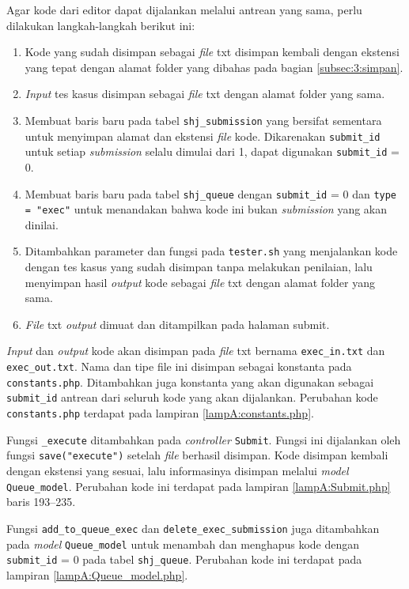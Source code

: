 Agar kode dari editor dapat dijalankan melalui antrean yang sama, perlu dilakukan langkah-langkah berikut ini:
\begin{enumerate}
    \item Kode yang sudah disimpan sebagai \textit{file} txt disimpan kembali dengan ekstensi yang tepat dengan alamat folder yang dibahas pada bagian \ref{subsec:3:simpan}.
    \item \textit{Input} tes kasus disimpan sebagai \textit{file} txt dengan alamat folder yang sama.
    \item Membuat baris baru pada tabel \verb|shj_submission| yang bersifat sementara untuk menyimpan alamat dan ekstensi \textit{file} kode. Dikarenakan \verb|submit_id| untuk setiap \textit{submission} selalu dimulai dari 1, dapat digunakan \verb|submit_id| = 0.
    \item Membuat baris baru pada tabel \verb|shj_queue| dengan \verb|submit_id| = 0 dan \verb|type = "exec"| untuk menandakan bahwa kode ini bukan \textit{submission} yang akan dinilai.
    \item Ditambahkan parameter dan fungsi pada \verb|tester.sh| yang menjalankan kode dengan tes kasus yang sudah disimpan tanpa melakukan penilaian, lalu menyimpan hasil \textit{output} kode sebagai \textit{file} txt dengan alamat folder yang sama.
    \item \textit{File} txt \textit{output} dimuat dan ditampilkan pada halaman submit.
\end{enumerate}

\textit{Input} dan \textit{output} kode akan disimpan pada \textit{file} txt bernama \verb|exec_in.txt| dan \verb|exec_out.txt|. Nama dan tipe file ini disimpan sebagai konstanta pada \verb|constants.php|. Ditambahkan juga konstanta yang akan digunakan sebagai \verb|submit_id| antrean dari seluruh kode yang akan dijalankan. Perubahan kode \verb|constants.php| terdapat pada lampiran \ref{lampA:constants.php}.

Fungsi \verb|_execute| ditambahkan pada \textit{controller} \verb|Submit|. Fungsi ini dijalankan oleh fungsi \verb|save("execute")| setelah \textit{file} berhasil disimpan. Kode disimpan kembali dengan ekstensi yang sesuai, lalu informasinya disimpan melalui \textit{model} \verb|Queue_model|. Perubahan kode ini terdapat pada lampiran \ref{lampA:Submit.php} baris 193--235.

Fungsi \verb|add_to_queue_exec| dan \verb|delete_exec_submission| juga ditambahkan pada \textit{model} \linebreak \verb|Queue_model| untuk menambah dan menghapus kode dengan \verb|submit_id| = 0 pada tabel \verb|shj_queue|. Perubahan kode ini terdapat pada lampiran \ref{lampA:Queue_model.php}.

